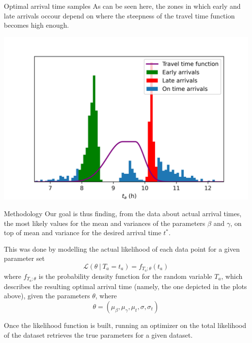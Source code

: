 \documentclass{beamer}
\begin{document}
\begin{frame}{Optimal arrival time samples}
  As can be seen here, the zones in which early and late arrivals occour depend on where the steepness of the travel time function becomes high enough.
  \begin{center}
    \includegraphics[width=\textwidth]{t_as_bins_tt}
  \end{center}
\end{frame}

\begin{frame}{Methodology}
  Our goal is thus finding, from the data about actual arrival times, the most likely values for the mean and variances of the parameters \(\beta\) and \(\gamma\), on top of mean and variance for the desired arrival time \(t^*\).

  This was done by modelling the actual likelihood of each data point for a given parameter set
  \begin{equation*}
    \mathcal{L}(\theta\ \vert\ T_a = t_a) =
  f_{T_a; \theta}(t_a)
  \end{equation*}
  where \(f_{T_a; \theta}\) is the probability density function for the random variable \(T_a\),
  which describes the resulting optimal arrival time (namely, the one depicted in the plots above), given the parameters \(\theta\), where
  \[\theta = (\mu_\beta, \mu_\gamma, \mu_t, \sigma, \sigma_t)\]
  
  Once the likelihood function is built, running an optimizer on the total likelihood of the dataset retrieves the true parameters for a given dataset.
\end{frame}
\end{document}
